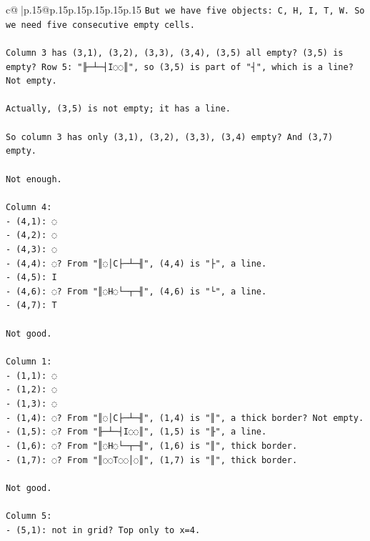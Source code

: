 \documentclass{article}
\begin{document}
{\begin{supertabular}{c@{$\;$}|p{.15\linewidth}@{}p{.15\linewidth}p{.15\linewidth}p{.15\linewidth}p{.15\linewidth}p{.15\linewidth}}
{{{\texttt{But we have five objects: C, H, I, T, W. So we need five consecutive empty cells.} \\
\\ 
\texttt{Column 3 has (3,1), (3,2), (3,3), (3,4), (3,5) all empty? (3,5) is empty? Row 5: "╟─┴─┤I◌◌║", so (3,5) is part of "┤", which is a line? Not empty.} \\
\\ 
\texttt{Actually, (3,5) is not empty; it has a line.} \\
\\ 
\texttt{So column 3 has only (3,1), (3,2), (3,3), (3,4) empty? And (3,7) empty.} \\
\\ 
\texttt{Not enough.} \\
\\ 
\texttt{Column 4:} \\
\texttt{{-} (4,1): ◌} \\
\texttt{{-} (4,2): ◌} \\
\texttt{{-} (4,3): ◌} \\
\texttt{{-} (4,4): ◌? From "║◌│C├─┴─╢", (4,4) is "├", a line.} \\
\texttt{{-} (4,5): I} \\
\texttt{{-} (4,6): ◌? From "║◌H◌└─┬─╢", (4,6) is "└", a line.} \\
\texttt{{-} (4,7): T} \\
\\ 
\texttt{Not good.} \\
\\ 
\texttt{Column 1:} \\
\texttt{{-} (1,1): ◌} \\
\texttt{{-} (1,2): ◌} \\
\texttt{{-} (1,3): ◌} \\
\texttt{{-} (1,4): ◌? From "║◌│C├─┴─╢", (1,4) is "║", a thick border? Not empty.} \\
\texttt{{-} (1,5): ◌? From "╟─┴─┤I◌◌║", (1,5) is "╟", a line.} \\
\texttt{{-} (1,6): ◌? From "║◌H◌└─┬─╢", (1,6) is "║", thick border.} \\
\texttt{{-} (1,7): ◌? From "║◌◌T◌◌│◌║", (1,7) is "║", thick border.} \\
\\ 
\texttt{Not good.} \\
\\ 
\texttt{Column 5:} \\
\texttt{{-} (5,1): not in grid? Top only to x=4.} \\
}}}
\end{supertabular}}
\end{document}
